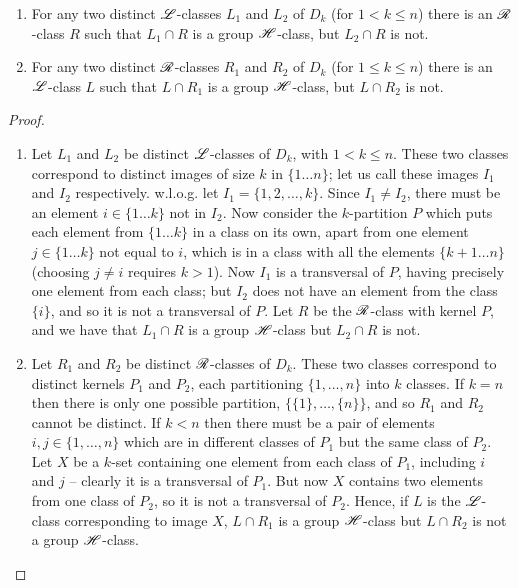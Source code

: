 \begin{lemma}
\label{lem:hclasses}
\leavevmode
  \begin{enumerate}
  \item For any two distinct $\mathrel{\mathscr{L}}$-classes $L_1$ and $L_2$ of $D_k$ (for
    $1 < k \leq n$) there is an $\mathrel{\mathscr{R}}$-class $R$ such that $L_1 \cap R$
    is a group $\mathrel{\mathscr{H}}$-class, but $L_2 \cap R$ is not.
  \item For any two distinct $\mathrel{\mathscr{R}}$-classes $R_1$ and $R_2$ of $D_k$ (for
    $1 \leq k \leq n$) there is an $\mathrel{\mathscr{L}}$-class $L$ such that $L \cap
    R_1$ is a group $\mathrel{\mathscr{H}}$-class, but $L \cap R_2$ is not.
  \end{enumerate}
  \begin{proof}
    \leavevmode
    \begin{enumerate}
    \item Let $L_1$ and $L_2$ be distinct $\mathrel{\mathscr{L}}$-classes of $D_k$, with
      $1 < k \leq n$.  These two classes correspond to distinct images of size
      $k$ in $\{1 \dots n\}$; let us call these images $I_1$ and $I_2$
      respectively.  w.l.o.g. let $I_1 = \{1, 2, \dots, k\}$.  Since $I_1 \neq
      I_2$, there must be an element $i \in \{1 \dots k\}$ not in $I_2$.  Now
      consider the $k$-partition $P$ which puts each element from $\{1 \dots
      k\}$ in a class on its own, apart from one element $j \in \{1 \dots k\}$
      not equal to $i$, which is in a class with all the elements $\{k+1 \dots
      n\}$ (choosing $j \neq i$ requires $k > 1$).  Now $I_1$ is a transversal
      of $P$, having precisely one element from each class; but $I_2$ does not
      have an element from the class $\{i\}$, and so it is not a transversal of
      $P$.  Let $R$ be the $\mathrel{\mathscr{R}}$-class with kernel $P$, and we have that
      $L_1 \cap R$ is a group $\mathrel{\mathscr{H}}$-class but $L_2 \cap R$ is not.

    \item Let $R_1$ and $R_2$ be distinct $\mathrel{\mathscr{R}}$-classes of $D_k$.  These two classes
      correspond to distinct kernels $P_1$ and $P_2$, each partitioning $\{1,
      \dots, n\}$ into $k$ classes.  If $k=n$ then there is only one possible
      partition, $\big\{\{1\}, \dots, \{n\}\big\}$, and so $R_1$ and $R_2$
      cannot be distinct.  If $k<n$ then there must be a pair of elements $i,j \in
      \{1,\dots, n\}$ which are in different classes of $P_1$ but the same class
      of $P_2$.  Let $X$ be a $k$-set containing one element from each class of
      $P_1$, including $i$ and $j$ -- clearly it is a transversal of $P_1$.  But
      now $X$ contains two elements from one class of $P_2$, so it is not a
      transversal of $P_2$.  Hence, if $L$ is the $\mathrel{\mathscr{L}}$-class corresponding to image
      $X$, $L \cap R_1$ is a group $\mathrel{\mathscr{H}}$-class but $L \cap R_2$ is not a group
      $\mathrel{\mathscr{H}}$-class.
    \end{enumerate}
  \end{proof}
\end{lemma}

